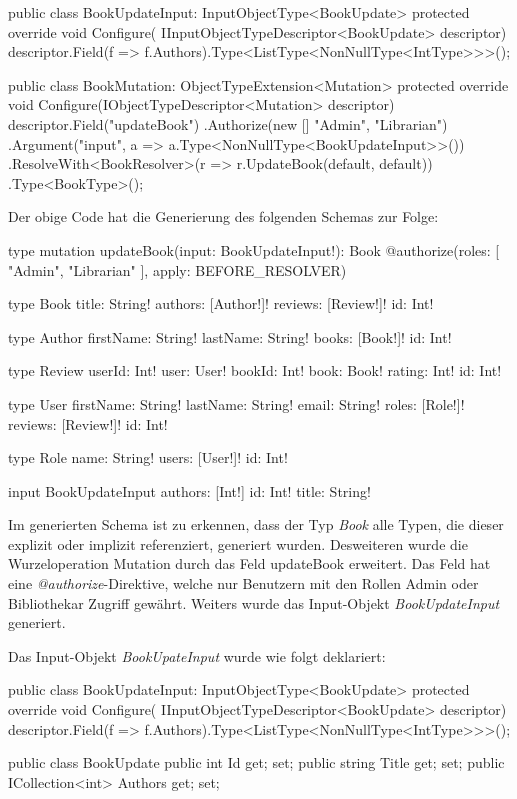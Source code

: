 \begin{JsCode}
public class BookUpdateInput: InputObjectType<BookUpdate> {
    protected override void Configure(
        IInputObjectTypeDescriptor<BookUpdate> descriptor)
    {
        descriptor.Field(f => f.Authors).Type<ListType<NonNullType<IntType>>>();
    }
}

public class BookMutation: ObjectTypeExtension<Mutation>{
    protected override void Configure(IObjectTypeDescriptor<Mutation> descriptor) {
        descriptor.Field("updateBook")
            .Authorize(new [] {"Admin", "Librarian"})
            .Argument("input", a => a.Type<NonNullType<BookUpdateInput>>())
            .ResolveWith<BookResolver>(r => r.UpdateBook(default, default))
            .Type<BookType>();
    }
}
\end{JsCode}

Der obige Code hat die Generierung des folgenden Schemas zur Folge:
\begin{JsCode}
type mutation{
    updateBook(input: BookUpdateInput!): Book @authorize(roles: [ "Admin", "Librarian" ], apply: BEFORE_RESOLVER)
}

type Book {
  title: String!
  authors: [Author!]!
  reviews: [Review!]!
  id: Int!
}

type Author {
  firstName: String!
  lastName: String!
  books: [Book!]!
  id: Int!
}

type Review {
  userId: Int!
  user: User!
  bookId: Int!
  book: Book!
  rating: Int!
  id: Int!
}

type User {
  firstName: String!
  lastName: String!
  email: String!
  roles: [Role!]!
  reviews: [Review!]!
  id: Int!
}

type Role {
  name: String!
  users: [User!]!
  id: Int!
}

input BookUpdateInput {
  authors: [Int!]
  id: Int!
  title: String!
}
\end{JsCode}

Im generierten Schema ist zu erkennen, dass der Typ \textit{Book} alle Typen, die dieser explizit oder implizit referenziert, generiert wurden.
Desweiteren wurde die Wurzeloperation Mutation durch das Feld updateBook erweitert.
Das Feld hat eine \textit{@authorize}-Direktive, welche nur Benutzern mit den Rollen Admin oder Bibliothekar Zugriff gewährt.
Weiters wurde das Input-Objekt \textit{BookUpdateInput} generiert.
\newline

Das Input-Objekt \textit{BookUpateInput} wurde wie folgt deklariert:
\begin{JsCode}
public class BookUpdateInput: InputObjectType<BookUpdate> {
    protected override void Configure(
        IInputObjectTypeDescriptor<BookUpdate> descriptor)
    {
        descriptor.Field(f => f.Authors).Type<ListType<NonNullType<IntType>>>();
    }
}

public class BookUpdate {
    public int Id { get; set; }
    public string Title { get; set; }
    public ICollection<int> Authors { get; set; }
}
\end{JsCode}

